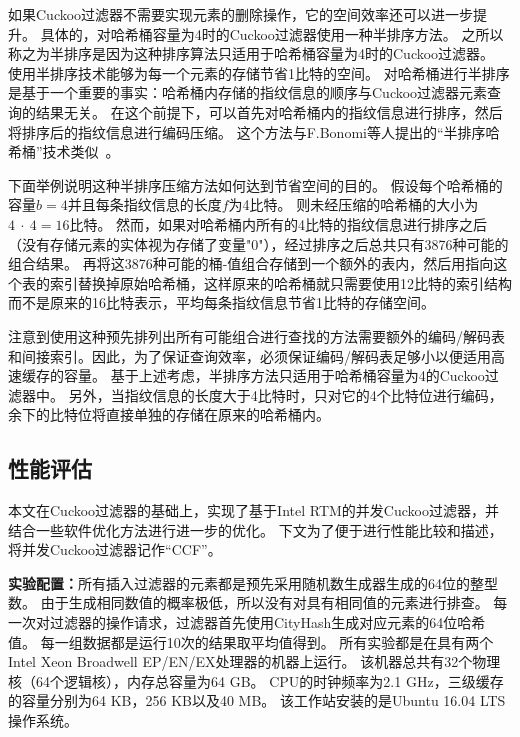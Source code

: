 如果Cuckoo过滤器不需要实现元素的删除操作，它的空间效率还可以进一步提升。
具体的，对哈希桶容量为4时的Cuckoo过滤器使用一种半排序方法。
之所以称之为半排序是因为这种排序算法只适用于哈希桶容量为4时的Cuckoo过滤器。
使用半排序技术能够为每一个元素的存储节省1比特的空间。
对哈希桶进行半排序是基于一个重要的事实：哈希桶内存储的指纹信息的顺序与Cuckoo过滤器元素查询的结果无关。
在这个前提下，可以首先对哈希桶内的指纹信息进行排序，然后将排序后的指纹信息进行编码压缩。
这个方法与F.Bonomi等人提出的“半排序哈希桶”技术类似~\cite{bonomi2006improved}。

下面举例说明这种半排序压缩方法如何达到节省空间的目的。
假设每个哈希桶的容量$b = 4$并且每条指纹信息的长度$f$为4比特。
则未经压缩的哈希桶的大小为$4~\cdot~4 = 16$比特。
然而，如果对哈希桶内所有的4比特的指纹信息进行排序之后（没有存储元素的实体视为存储了变量"0"），经过排序之后总共只有3876种可能的组合结果。
再将这3876种可能的桶-值组合存储到一个额外的表内，然后用指向这个表的索引替换掉原始哈希桶，这样原来的哈希桶就只需要使用12比特的索引结构而不是原来的16比特表示，平均每条指纹信息节省1比特的存储空间。

注意到使用这种预先排列出所有可能组合进行查找的方法需要额外的编码/解码表和间接索引。因此，为了保证查询效率，必须保证编码/解码表足够小以便适用高速缓存的容量。
基于上述考虑，半排序方法只适用于哈希桶容量为4的Cuckoo过滤器中。
另外，当指纹信息的长度大于4比特时，只对它的4个比特位进行编码，余下的比特位将直接单独的存储在原来的哈希桶内。

\subsection{性能评估}
本文在Cuckoo过滤器的基础上\cite{fan2014cuckoo}，实现了基于Intel RTM的并发Cuckoo过滤器，并结合一些软件优化方法进行进一步的优化。
下文为了便于进行性能比较和描述，将并发Cuckoo过滤器记作“CCF”。

\textbf{实验配置：}所有插入过滤器的元素都是预先采用随机数生成器生成的64位的整型数。
由于生成相同数值的概率极低，所以没有对具有相同值的元素进行排查。
每一次对过滤器的操作请求，过滤器首先使用CityHash\cite{cityhash}生成对应元素的64位哈希值。
每一组数据都是运行10次的结果取平均值得到。
所有实验都是在具有两个Intel Xeon Broadwell EP/EN/EX处理器的机器上运行。
该机器总共有32个物理核（64个逻辑核），内存总容量为64 GB。
CPU的时钟频率为2.1 GHz，三级缓存的容量分别为64 KB，256 KB以及40 MB。
该工作站安装的是Ubuntu 16.04 LTS操作系统。

